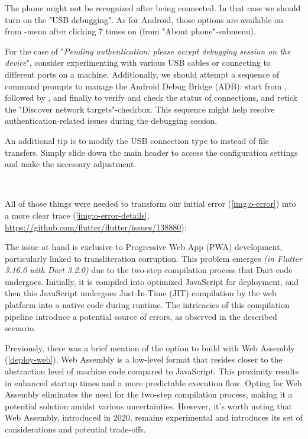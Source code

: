 
\noindent The phone might not be recognized after being connected. In that case we should turn on the "USB debugging".
As for Android, those options are available on  from -menu after clicking 7 times 
on  (from "About phone"-submenu).

For the case of "\emph{Pending authentication: please accept debugging session on the device}", consider experimenting 
with various USB cables or connecting to different ports on a machine. Additionally, we should attempt a sequence of 
command prompts to manage the Android Debug Bridge (ADB): start from , followed by 
, and finally  to verify and check the status of connections, and retick the 
"Discover network targets"-checkbox. This sequence might help resolve authentication-related issues during the debugging 
session.

An additional tip is to modify the USB connection type to  instead of file transfers. Simply slide down the 
main header to access the configuration settings and make the necessary adjustment.

~

\noindent All of those things were needed to transform our initial error (\cref{img:o-error}) into a more clear trace 
(\cref{img:o-error-details}, 
\href{https://github.com/flutter/flutter/issues/138880}{https://github.com/flutter/flutter/issues/138880}):


\noindent The issue at hand is exclusive to Progressive Web App (PWA) development, particularly linked to transliteration 
corruption. This problem emerges \emph{(in Flutter 3.16.0 with Dart 3.2.0)} due to the two-step compilation process 
that Dart code undergoes. Initially, it is compiled into optimized JavaScript for deployment, and then this JavaScript 
undergoes Just-In-Time (JIT) compilation by the web platform into a native code during runtime. The intricacies of this 
compilation pipeline introduce a potential source of errors, as observed in the described scenario.

Previously, there was a brief mention of the option to build with Web Assembly (\ref{deploy-web}). Web Assembly is a 
low-level format that resides closer to the abstraction level of machine code compared to JavaScript. This proximity 
results in enhanced startup times and a more predictable execution flow. Opting for Web Assembly eliminates the need 
for the two-step compilation process, making it a potential solution amidst various uncertainties. However, it's worth 
noting that Web Assembly, introduced in 2020, remains experimental and introduces its set of considerations and 
potential trade-offs.


